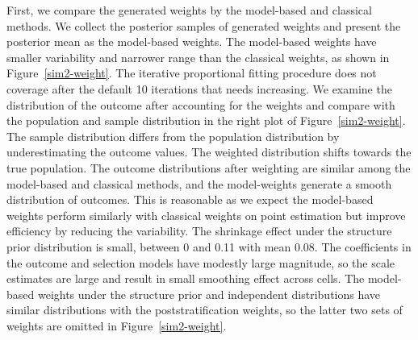 \documentclass[11pt]{article}
\begin{document}
First, we compare the generated weights by the model-based and classical methods. We collect the posterior samples of generated weights and present the posterior mean as the model-based weights. The model-based weights have smaller variability and narrower range than the classical weights, as shown in Figure~\ref{sim2-weight}. The iterative proportional fitting procedure does not coverage after the default 10 iterations that needs increasing. We examine the distribution of the outcome after accounting for the weights and compare with the population and sample distribution in the right plot of Figure~\ref{sim2-weight}. The sample distribution differs from the population distribution by underestimating the outcome values. The weighted distribution shifts towards the true population. The outcome distributions after weighting are similar among the model-based and classical methods, and the model-weights generate a smooth distribution of outcomes. This is reasonable as we expect the model-based weights perform similarly with classical weights on point estimation but improve efficiency by reducing the variability. The shrinkage effect under the structure prior distribution is small, between 0 and 0.11 with mean 0.08. The coefficients in the outcome and selection models have modestly large magnitude, so the scale estimates are large and result in small smoothing effect across cells. The model-based weights under the structure prior and independent distributions have similar distributions with the poststratification weights, so the latter two sets of weights are omitted in Figure~\ref{sim2-weight}. 
\end{document}
